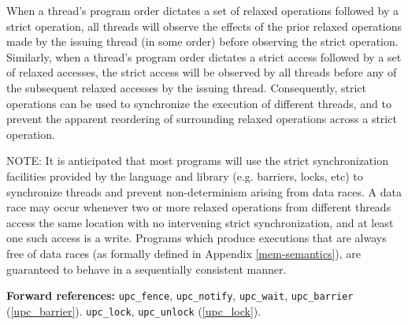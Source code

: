 \np When a thread's program order dictates a set of relaxed
  operations followed by
  a strict operation, all threads will observe the effects of the prior relaxed
  operations made by the issuing thread (in some order) before observing the
  strict operation. Similarly, when a thread's program order dictates a strict
  access followed by a set of relaxed accesses, the strict access will be
  observed by all threads before any of the subsequent relaxed accesses by the
  issuing thread. Consequently, strict operations can be used to synchronize the
  execution of different threads, and to prevent the apparent reordering of
  surrounding relaxed operations across a strict operation.

\np NOTE: It is anticipated that most programs will use the strict 
  synchronization facilities provided by the
  language and library (e.g. barriers, locks, etc) to synchronize threads and
  prevent non-determinism arising from data races. A data race may occur whenever
  two or more relaxed operations from different threads access the same location
  with no intervening strict synchronization, and at least one such access is a
  write. Programs which produce executions that are always free of data races (as
  formally defined in Appendix \ref{mem-semantics}), are guaranteed to behave in
  a sequentially consistent manner.

   {\bf Forward references:} {\tt upc\_fence}, {\tt upc\_notify}, 
    {\tt upc\_wait}, {\tt upc\_barrier} (\ref{upc_barrier}). {\tt upc\_lock},
    {\tt upc\_unlock} (\ref{upc_lock}).
    
